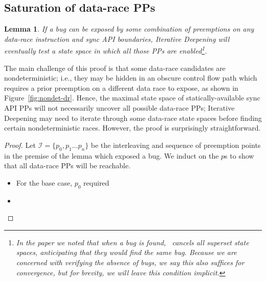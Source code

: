 \documentclass[pldi]{sigplanconf-pldi15}
\newtheorem{lemma}{Lemma}
\begin{document}
\subsection{Saturation of data-race PPs}

\begin{lemma}
	If a bug can be exposed by some combination of preemptions on any data-race instruction and sync API boundaries,
	Iterative Deepening will eventually test a state space in which all those PPs are enabled\footnote{
		In the paper we noted that when a bug is found, \quicksand~cancels all superset state spaces, anticipating that they would find the same bug.
		Because we are concerned with verifying the absence of bugs, we say this also suffices for convergence, but for brevity, we will leave this condition implicit.}.
	\label{lem:saturation}
\end{lemma}

The main challenge of this proof is that some data-race candidates are nondeterministic;
i.e., they may be hidden in an obscure control flow path which requires a prior preemption on a different data race to expose,
as shown in Figure~\ref{fig:nondet-dr}.
Hence, the maximal state space of statically-available sync API PPs will not necessarily uncover all possible data-race PPs;
Iterative Deepening may need to iterate through some data-race state spaces before finding certain nondeterministic races.
However, the proof is surprisingly straightforward.

\begin{proof}
Let $\mathcal{I} = \{p_0, p_1 \dots p_n\}$ be the interleaving and sequence of preemption points in the premise of the lemma which exposed a bug.
We induct on the $p$s to show that all data-race PPs will be reachable.
\begin{itemize}
	\item For the base case, $p_0$ required 
	\item
\end{itemize}
\end{proof}
\end{document}
